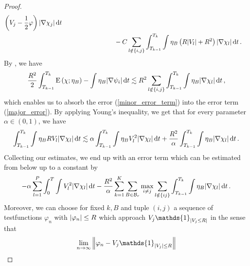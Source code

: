 \begin{proof}
\begin{align}
		\left( V_{ j } - \frac{ 1 }{ 2 } \varphi  \right)
		\abs{ \nabla \chi_{ j } }
		\dd{ t }
		\\
		\label{major_error}
		& \qquad \qquad \qquad \qquad -
		C \sum_{ l \notin \{ i , j \} }
		\int_{ T_{ k - 1 } }^{ T_{ k } }
			\int
				\eta_{ B } 
				\left(
					R \abs{ V_{ l } }
					+
					R^{ 2 }
				\right)
			\abs{ \nabla \chi_{ l } }
		\dd{ t }.
	\end{align}
	By , we have
	\begin{equation*}
				\frac{ R^{ 2 } }{ 2 }
		\int_{ T_{ k - 1 } }^{ T_{ k } }
		\operatorname{E} \left( \chi ; \eta_{ B } \right)
		-
		\int
		\eta_{ B }
		\abs{ \nabla \psi_{ i } }
		\dd{ t }
		\lesssim
		R^{ 2 }
		\sum_{ l \notin \{ i , j \} }
		\int_{ T_{ k - 1 } }^{ T_{ k } }
		\int
		\eta_{ B }
		\abs{ \nabla \chi_{ l } }
		\dd{ t },
	\end{equation*}
	which enables us to absorb the error (\ref{minor_error_term}) into the 
	error term  (\ref{major_error}).
	By applying Young's inequality, we get that for every parameter $ 
	\alpha \in ( 0 , 1 ) $, we have
	\begin{equation*}
		\int_{ T_{ k - 1 } }^{ T_{ k } }
			\int
				\eta_{ B } R V_{ l }
			\abs{ \nabla \chi_{ l } }
		\dd{ t }
		\lesssim
		\alpha
			\int_{ T_{ k - 1 } }^{ T_{ k } }
				\int
					\eta_{ B }
					V_{ l }^{ 2 }
				\abs{ \nabla \chi_{ l } }
			\dd{ t }
		+
		\frac{ R^{ 2 } }{ \alpha }
			\int_{ T_{ k - 1 } }^{ T_{k } }
				\int
					\eta_{ B }
				\abs{ \nabla \chi_{ l } }
			\dd{ t }.
	\end{equation*}
	Collecting our estimates, we end up with an error term which can be 
	estimated from below up to a constant by
	\begin{align*}
		- \alpha \sum_{ l = 1 }^{ P }
			\int_{ 0 }^{ T }
				\int
					V_{ l }^{ 2 }
				\abs{ \nabla \chi_{ l } }
			\dd{ t }
		-
		\frac{ R^{ 2 } }{ \alpha }
		\sum_{ k = 1 }^{ K }
			\sum_{ B \in \mathcal{ B }_{ r } }
				\max_{ i \neq j }
					\sum_{ l \notin \{ i j \} }
						\int_{ T_{ k - 1 } }^{ T_{ k } }
							\int
								\eta_{ B }
							\abs{ \nabla \chi_{ l } }
						\dd{ t }.
	\end{align*}
	Moreover, we can choose for fixed $k , B $ and tuple $ (i, j ) $ a sequence 
	of testfunctions $ \varphi_{ n } $ with $ \abs{ \varphi_{ n } } \leq R $ 
	which approach $ V_{ j } \mathds{ 1 }_{ \abs{ V_{ j } \leq R } } $
	in the sense that
	\begin{equation*}
		\lim_{ n \to \infty }
		\norm{ \varphi_{ n } - V_{ j } \mathds{ 1 }_{ \abs{ V_{ j } } \leq R } 
}
\end{equation*}
\end{proof}
